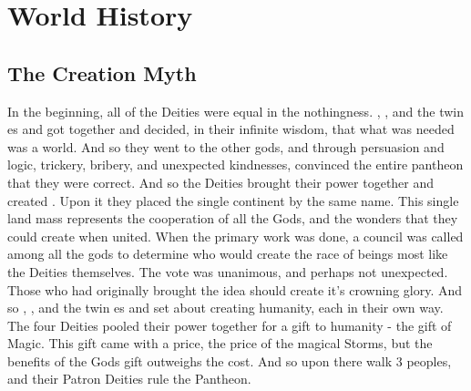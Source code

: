 \documentclass[blue]{GL2020}
\begin{document}
\name{\bWorld{}}

\section*{World History}

\subsection*{The Creation Myth}

In the beginning, all of the Deities were equal in the nothingness. \cFarmGod{}, \cTechGod{}, and the twin \cEbb{\God}es \cEbb{} and \cFlow{} got together and decided, in their infinite wisdom, that what was needed was a world. And so they went to the other gods, and through persuasion and logic, trickery, bribery, and unexpected kindnesses, convinced the entire pantheon that they were correct. And so the Deities brought their power together and created \pEarth{}. Upon it they placed the single continent by the same name. This single land mass represents the cooperation of all the Gods, and the wonders that they could create when united. When the primary work was done, a council was called among all the gods to determine who would create the race of beings most like the Deities themselves. The vote was unanimous, and perhaps not unexpected. Those who had originally brought the idea should create it's crowning glory. And so \cFarmGod{}, \cTechGod{}, and the twin \cEbb{\God}es \cEbb{} and \cFlow{} set about creating humanity, each in their own way. The four Deities pooled their power together for a gift to humanity - the gift of Magic.  This gift came with a price, the price of the magical Storms, but the benefits of the Gods gift outweighs the cost.  And so upon \pEarth{} there walk 3 peoples, and their Patron Deities rule the Pantheon.

\end{document}
